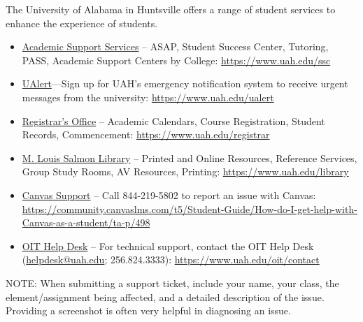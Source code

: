 \documentclass[12pt,nohyper,nobib,xcolor=dvipsnames,svgnames,x11names]{tufte-book}
\begin{document}
The University of Alabama in Huntsville offers a range of student services to enhance the experience of students. 
\begin{itemize}
 

\item \href{https://www.uah.edu/ssc}{Academic Support Services} -- ASAP, Student Success Center, Tutoring, PASS, Academic Support Centers by College: \url{https://www.uah.edu/ssc}


\item \href{https://www.uah.edu/ualert}{UAlert}—Sign up for UAH’s emergency notification system to receive urgent messages from the university: \url{https://www.uah.edu/ualert}

\item \href{https://www.uah.edu/registrar}{Registrar’s Office} -- Academic Calendars, Course Registration, Student Records, Commencement: \url{https://www.uah.edu/registrar}

\item \href{https://www.uah.edu/library}{M. Louis Salmon Library}  -- Printed and Online Resources, Reference Services, Group Study Rooms, AV Resources, Printing: \url{https://www.uah.edu/library}

\item \href{https://community.canvaslms.com/t5/Student-Guide/How-do-I-get-help-with-Canvas-as-a-student/ta-p/498}{Canvas Support} -- Call 844-219-5802 to report an issue with Canvas: \url{https://community.canvaslms.com/t5/Student-Guide/How-do-I-get-help-with-Canvas-as-a-student/ta-p/498}

\item \href{https://www.uah.edu/oit/contact}{OIT Help Desk} -- For technical support, contact the OIT Help Desk (\href{mailto:helpdesk@uah.edu}{helpdesk@uah.edu}; 256.824.3333): \url{https://www.uah.edu/oit/contact}

\end{itemize}

NOTE: When submitting a support ticket, include your name, your class, the element/assignment being affected, and a detailed description of the issue. Providing a screenshot is often very helpful in diagnosing an issue.
\end{document}
